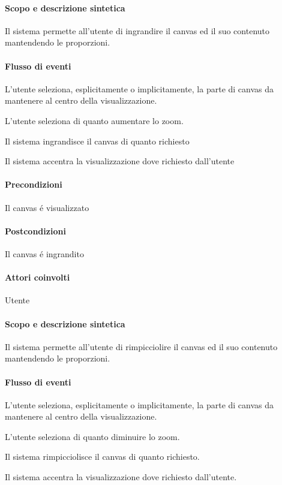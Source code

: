 \paragraph{Scopo e descrizione sintetica} 
Il sistema permette all'utente di ingrandire il canvas ed il suo contenuto mantendendo le proporzioni.
\paragraph{Flusso di eventi}
\begin{elenconumerato}[\textbf{}]{\subsubsecindent}
\item L'utente seleziona, esplicitamente o implicitamente, la parte di canvas da mantenere al centro della visualizzazione.
\item L'utente seleziona di quanto aumentare lo zoom.
\item Il sistema ingrandisce il canvas di quanto richiesto
\item Il sistema accentra la visualizzazione dove richiesto dall'utente
\end{elenconumerato}
\paragraph{Precondizioni} Il canvas \'e visualizzato
\paragraph{Postcondizioni} Il canvas \'e ingrandito

\paragraph{Attori coinvolti} Utente
\paragraph{Scopo e descrizione sintetica} 
Il sistema permette all'utente di rimpicciolire il canvas ed il suo contenuto mantendendo le proporzioni.
\paragraph{Flusso di eventi}
\begin{elenconumerato}[\textbf{}]{\subsubsecindent}
\item L'utente seleziona, esplicitamente o implicitamente, la parte di canvas da mantenere al centro della visualizzazione.
\item L'utente seleziona di quanto diminuire lo zoom.
\item Il sistema rimpicciolisce il canvas di quanto richiesto.
\item Il sistema accentra la visualizzazione dove richiesto dall'utente.
\end{elenconumerato}
